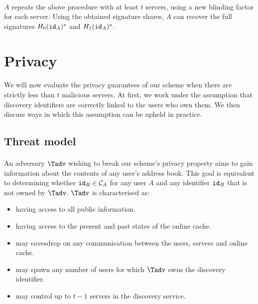 	\paragraph{} $A$ repeats the above procedure with at least $t$ servers, using a new blinding factor for each server. Using the obtained signature shares, $A$ can recover the full signatures $H_0(\mathtt{id}_A)^s$ and $H_1(\mathtt{id}_A)^s$.
	
	


\section{Privacy}
\label{sec:security}


\paragraph{} We will now evaluate the privacy guarantees of our scheme when there are strictly less than $t$ malicious servers. At first, we work under the assumption that discovery identifiers are correctly linked to the users who own them. We then discuss ways in which this assumption can be upheld in practice.





	\subsection{Threat model}
	\paragraph{} An adversary $\Tadv$ wishing to break our scheme's privacy property aims to gain information about the contents of any user's address book. This goal is equivalent to determining whether $\mathtt{id}_B \in \mathcal{C}_{A}$ for any user $A$ and any identifier $\mathtt{id}_B$ that is not owned by $\Tadv$. $\Tadv$ is characterised as:
	\begin{itemize}
		\item having access to all public information.
		\item having access to the present and past states of the online cache.
		\item may eavesdrop on any communication between the users, servers and online cache.
		\item may spawn any number of users for which $\Tadv$ owns the discovery identifier.
		\item may control up to $t-1$ servers in the discovery service.
	\end{itemize}
	
